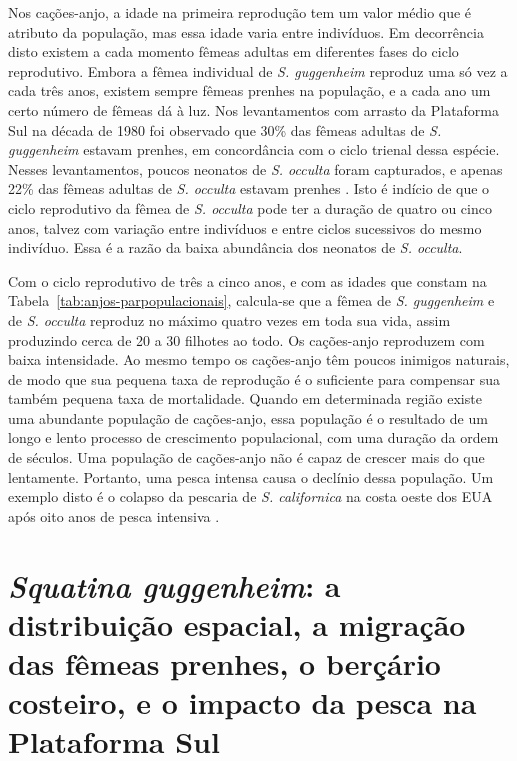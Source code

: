 \documentclass[a4paper,11pt,twoside,showtrims,onecolumn,openright,final]{memoir}
\begin{document}

Nos cações-anjo, a idade na primeira reprodução tem um valor médio que é atributo da população, 
mas essa idade varia entre indivíduos. Em decorrência disto existem a cada momento fêmeas 
adultas em diferentes fases do ciclo reprodutivo.  Embora a fêmea individual de \emph{S. guggenheim}
reproduz uma só vez a cada três anos, existem sempre fêmeas prenhes na população, e a cada ano 
um certo número de fêmeas dá à luz. Nos levantamentos com arrasto da Plataforma Sul na década de 
1980 foi observado que 30\% das fêmeas adultas de \emph{S. guggenheim} estavam prenhes, em concordância 
com o ciclo trienal dessa espécie.  Nesses levantamentos,  poucos neonatos de \emph{S. occulta} foram 
capturados, e apenas 22\% das fêmeas adultas de \emph{S. occulta} estavam prenhes \citep{silva1996}. %
Isto é indício de que o ciclo reprodutivo da fêmea de \emph{S. occulta} pode ter a duração de quatro 
ou cinco anos, talvez com variação entre indivíduos e entre ciclos sucessivos do mesmo indivíduo. 
Essa é a razão da baixa abundância dos neonatos de \emph{S. occulta}. 

Com o ciclo reprodutivo de três a cinco anos, e com as idades que constam na Tabela~\ref{tab:anjos-parpopulacionais}, 
calcula-se que a fêmea de \emph{S. guggenheim} e de \emph{S. occulta} reproduz no máximo quatro vezes em 
toda sua vida, assim produzindo cerca de 20 a 30 filhotes ao todo. Os cações-anjo reproduzem 
com baixa intensidade. Ao mesmo tempo os cações-anjo têm poucos inimigos naturais, de modo 
que sua pequena taxa de reprodução é o suficiente para compensar sua também pequena 
taxa de mortalidade.  Quando em determinada região existe uma abundante população de 
cações-anjo, essa população é o resultado de um longo e lento processo de crescimento 
populacional, com uma duração da ordem de séculos. Uma população de cações-anjo não é 
capaz de crescer mais do que lentamente. Portanto, uma pesca intensa causa o declínio 
dessa população. Um exemplo disto é o colapso da pescaria de \emph{S. californica} na costa 
oeste dos EUA após oito anos de pesca intensiva \citep{bonfil1994}. %

\section*{\emph{Squatina guggenheim}: a distribuição espacial, a migração das fêmeas prenhes, 
          o berçário costeiro, e o impacto da pesca na Plataforma Sul}

%
%
\end{document}
